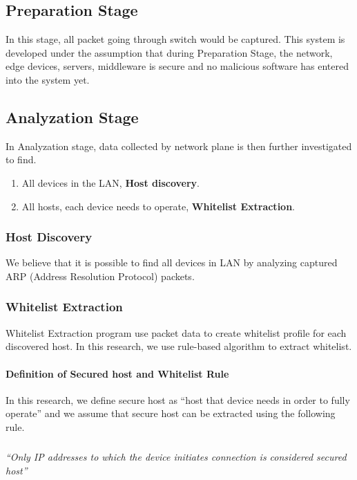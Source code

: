 \subsection{Preparation Stage}
In this stage, all packet going through switch would be captured. This system is developed under the assumption that during Preparation Stage, the network, edge devices, servers, middleware is secure and no malicious software has entered into the system yet.

\subsection{Analyzation Stage}
In Analyzation stage, data collected by network plane is then further investigated to find.  
\begin{enumerate}
    \item All devices in the LAN, \textbf{Host discovery}.
    \item All hosts, each device needs to operate, \textbf{Whitelist Extraction}. 
\end{enumerate}

\subsubsection{Host Discovery}
We believe that it is possible to find all devices in LAN by analyzing captured ARP (Address Resolution Protocol) packets.

\subsubsection{Whitelist Extraction}
Whitelist Extraction program use packet data to create whitelist profile for each discovered host. In this research, we use rule-based algorithm to extract whitelist.

\paragraph{Definition of Secured host and Whitelist Rule}
In this research, we define secure host as “host that device needs in order to fully operate” and we assume that secure host can be extracted using the following rule.  

\subparagraph{}
\begin{centering}
    \textit{“Only IP addresses to which the device initiates connection is considered secured host”} \\
\end{centering} 

